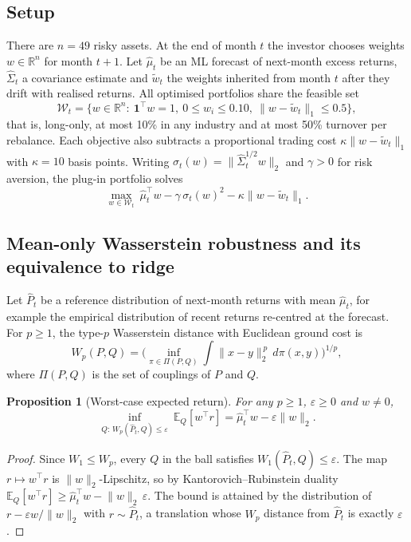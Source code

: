 \documentclass[11pt]{article}
\newtheorem{proposition}{Proposition}
\newcommand{\R}{\mathbb{R}}
\newcommand{\E}{\mathbb{E}}
\begin{document}
\subsection{Setup}
There are $n=49$ risky assets. At the end of month $t$ the investor chooses weights $w \in \R^n$ for month $t+1$. Let $\hat\mu_t$ be an ML forecast of next-month excess returns, $\hat\Sigma_t$ a covariance estimate and $\tilde w_t$ the weights inherited from month $t$ after they drift with realised returns. All optimised portfolios share the feasible set
\begin{equation}\label{eq:feasible}
\mathcal{W}_t=\Big\{w\in\R^n:\ \mathbf{1}^\top w=1,\ 0\le w_i\le 0.10,\ \lVert w-\tilde w_t\rVert_1\le 0.5\Big\},
\end{equation}
that is, long-only, at most 10\% in any industry and at most 50\% turnover per rebalance. Each objective also subtracts a proportional trading cost $\kappa\lVert w-\tilde w_t\rVert_1$ with $\kappa=10$ basis points. Writing $\sigma_t(w)=\lVert \hat\Sigma_t^{1/2}w\rVert_2$ and $\gamma>0$ for risk aversion, the plug-in portfolio solves
\begin{equation}\label{eq:plugin}
\max_{w\in\mathcal{W}_t}\ \hat\mu_t^\top w-\gamma\,\sigma_t(w)^2-\kappa\lVert w-\tilde w_t\rVert_1 .
\end{equation}

\subsection{Mean-only Wasserstein robustness and its equivalence to ridge}
Let $\hat P_t$ be a reference distribution of next-month returns with mean $\hat\mu_t$, for example the empirical distribution of recent returns re-centred at the forecast. For $p\ge1$, the type-$p$ Wasserstein distance with Euclidean ground cost is
\[
W_p(P,Q)=\Big(\inf_{\pi\in\Pi(P,Q)}\int\lVert x-y\rVert_2^{\,p}\,d\pi(x,y)\Big)^{1/p},
\]
where $\Pi(P,Q)$ is the set of couplings of $P$ and $Q$.

\begin{proposition}[Worst-case expected return]\label{prop:wc}
For any $p\ge1$, $\varepsilon\ge0$ and $w\neq0$,
\[
\inf_{Q:\,W_p(\hat P_t,Q)\le\varepsilon}\ \E_Q[w^\top r]=\hat\mu_t^\top w-\varepsilon\lVert w\rVert_2 .
\]
\end{proposition}
\begin{proof}
Since $W_1\le W_p$, every $Q$ in the ball satisfies $W_1(\hat P_t,Q)\le\varepsilon$. The map $r\mapsto w^\top r$ is $\lVert w\rVert_2$-Lipschitz, so by Kantorovich--Rubinstein duality $\E_Q[w^\top r]\ge \hat\mu_t^\top w-\lVert w\rVert_2\,\varepsilon$. The bound is attained by the distribution of $r-\varepsilon w/\lVert w\rVert_2$ with $r\sim\hat P_t$, a translation whose $W_p$ distance from $\hat P_t$ is exactly $\varepsilon$.
\end{proof}
\end{document}
